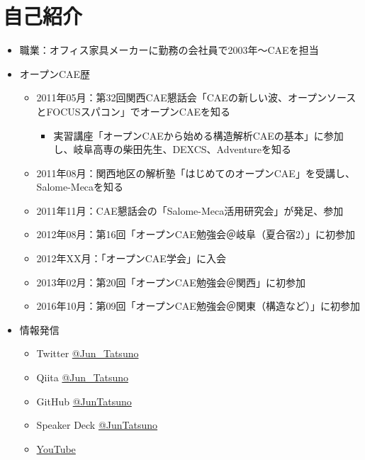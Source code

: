 \section{自己紹介}
\begin{itemize}
	\item 職業：オフィス家具メーカーに勤務の会社員で2003年～CAEを担当
	\item オープンCAE歴
	      \begin{itemize}
		      \item 2011年05月：第32回関西CAE懇話会「CAEの新しい波、オープンソースとFOCUSスパコン」でオープンCAEを知る
		            \begin{itemize}
			            \item 実習講座「オープンCAEから始める構造解析CAEの基本」に参加し、岐阜高専の柴田先生、DEXCS、Adventureを知る
		            \end{itemize}
		      \item 2011年08月：関西地区の解析塾「はじめてのオープンCAE」を受講し、Salome-Mecaを知る
		      \item 2011年11月：CAE懇話会の「Salome-Meca活用研究会」が発足、参加
		      \item 2012年08月：第16回「オープンCAE勉強会＠岐阜（夏合宿2）」に初参加
		      \item 2012年XX月：「オープンCAE学会」に入会
		      \item 2013年02月：第20回「オープンCAE勉強会＠関西」に初参加
		      \item 2016年10月：第09回「オープンCAE勉強会＠関東（構造など）」に初参加
	      \end{itemize}
	\item 情報発信
	      \begin{itemize}
		      \item Twitter \href{https://twitter.com/Jun_Tatsuno}{@Jun\_Tatsuno}
		      \item Qiita \href{https://qiita.com/Jun_Tatsuno}{@Jun\_Tatsuno}
		      \item GitHub \href{https://github.com/JunTatsuno/}{@JunTatsuno}
		      \item Speaker Deck \href{https://speakerdeck.com/juntatsuno/}{@JunTatsuno}
		      \item \href{https://www.youtube.com/playlist?list=PL3Ey4GcIvUy-2_ZMZ7dG_Wez4H__rin5c}{YouTube}
	      \end{itemize}
\end{itemize}
